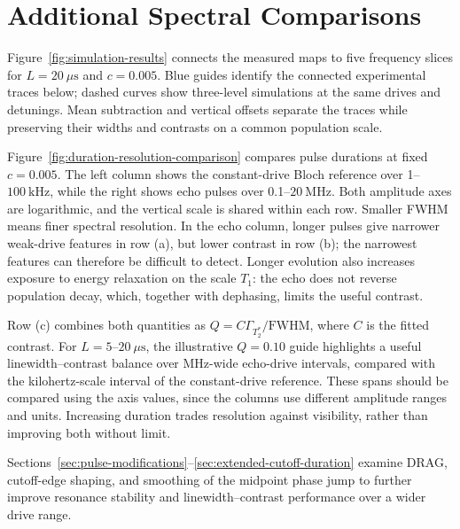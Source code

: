 \section{Additional Spectral Comparisons}
\label{sec:additional-spectral-comparisons}
\label{sec:fixed-amplitude-spectra}

Figure~\ref{fig:simulation-results} connects the measured maps to five
frequency slices for $L=20~\mu\mathrm{s}$ and $c=0.005$.
Blue guides identify the connected experimental traces below; dashed curves
show three-level simulations at the same drives and detunings.
Mean subtraction and vertical offsets separate the traces while preserving
their widths and contrasts on a common population scale.



Figure~\ref{fig:duration-resolution-comparison} compares pulse durations at
fixed $c=0.005$. The left column shows the constant-drive Bloch reference
over 1--$100~\mathrm{kHz}$, while the right shows echo pulses over
0.1--$20~\mathrm{MHz}$. Both amplitude axes are logarithmic, and the
vertical scale is shared within each row.
Smaller FWHM means finer spectral resolution. In the echo column, longer
pulses give narrower weak-drive features in row (a), but lower contrast in row (b);
the narrowest features can therefore be difficult to detect.
Longer evolution also increases exposure to energy relaxation on the scale
$T_1$: the echo does not reverse population decay, which, together with
dephasing, limits the useful contrast.

Row (c) combines both quantities as
$Q=C\Gamma_{T_2^*}/\mathrm{FWHM}$, where $C$ is the fitted contrast.
For $L=5$--$20~\mu\mathrm{s}$, the illustrative $Q=0.10$ guide highlights a
useful linewidth--contrast balance over MHz-wide echo-drive intervals,
compared with the kilohertz-scale interval of the constant-drive reference.
These spans should be compared using the axis values, since the columns
use different amplitude ranges and units. Increasing duration trades resolution
against visibility, rather than improving both without limit.

Sections~\ref{sec:pulse-modifications}--\ref{sec:extended-cutoff-duration}
examine DRAG, cutoff-edge shaping, and smoothing of the midpoint phase jump
to further improve resonance stability and linewidth--contrast performance
over a wider drive range.


